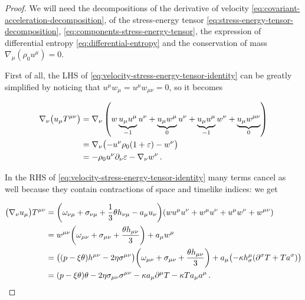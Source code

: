 \documentclass[main.tex]{subfiles}
\begin{document}
\begin{proof}
    We will need the decompositions of
    the derivative of velocity \eqref{eq:covariant-acceleration-decomposition},
    of the stress-energy tensor \eqref{eq:stress-energy-tensor-decomposition}, \eqref{eq:components-stress-energy-tensor},
    the expression of differential entropy \eqref{eq:differential-entropy}
    and the conservation of mass \(\nabla_\mu (\rho_0 u^\mu) = 0\).

    First of all, the LHS of \eqref{eq:velocity-stress-energy-tensor-identity} can be greatly simplified by noticing that \(u^\mu w_\mu = u^\mu w_{\mu \nu} = 0\), so it becomes %

    \vspace{-1cm}

    \begin{subequations}
    \begin{align}
        \nabla_\nu \qty(u_\mu T ^{\mu \nu}) &= \nabla_\nu \left( w \underbrace{u_\mu u^\mu}_{-1} u^\nu + \underbrace{u_\mu w^\mu}_{0} u^\nu + \underbrace{ u_\mu u^\mu}_{-1} w^\nu + \underbrace{u_\mu w ^{\mu \nu}}_{0}\right) \\
         &= \nabla_\nu \qty(- u^\nu \rho_0 (1 + \varepsilon) - w^\nu) \\
         &=  - \rho_0 u^\nu \partial_\nu \varepsilon - \nabla_\nu w^\nu\,.
    \end{align}
    \end{subequations}

    In the RHS of \eqref{eq:velocity-stress-energy-tensor-identity} many terms cancel as well because they contain contractions of space and timelike indices: we get

    \begin{subequations}
    \begin{align}
      \qty(\nabla_\nu u_\mu) T^{\mu \nu} &=
      \qty(\omega_{\nu \mu} + \sigma_{\nu\mu} + \frac{1}{3} \theta h_{\nu\mu}
      -  a_\mu u_\nu) \qty(w u^\mu u^\nu + w^\mu u^\nu + u^\mu w^\nu + w ^{\mu \nu})  \\
      &= w^{\mu\nu} \qty(\omega_{\mu\nu} + \sigma_{\mu\nu} + \frac{\theta h_{\mu\nu}}{3}) + a_\mu w^\mu  \\
      &= \qty(\qty(p - \xi \theta) h^{\mu \nu} - 2 \eta \sigma^{\mu \nu})
      \qty(\omega_{\mu\nu} + \sigma_{\mu\nu} + \frac{\theta h_{\mu\nu}}{3})
      + a_\mu \qty(-\kappa h^\mu _\sigma  \qty(\partial^\sigma T + T a^\sigma))  \\
      &= \qty(p - \xi \theta) \theta - 2 \eta \sigma_{\mu\nu} \sigma^{\mu\nu}
      - \kappa a_\mu \partial^\mu T - \kappa T a_\mu a^\mu \,.
    \end{align}
    \end{subequations}


\end{proof}
\end{document}
